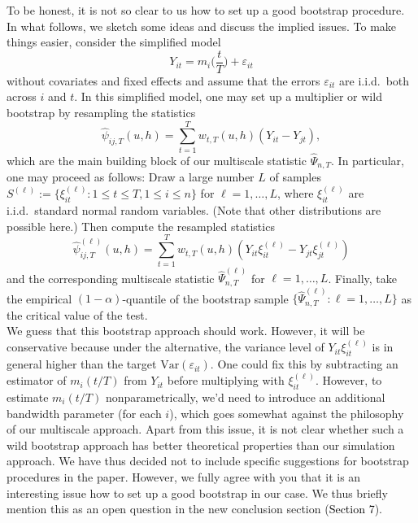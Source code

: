 \documentclass[a4paper,12pt]{article}
\newcommand{\reference}[1]{\textcolor{black}{#1}}
\begin{document}
\begin{enumerate}[label=\arabic*.,leftmargin=0.6cm]
To be honest, it is not so clear to us how to set up a good bootstrap procedure. In what follows, we sketch some ideas and discuss the implied issues. To make things easier, consider the simplified model 
\[ Y_{it} = m_i\Big(\frac{t}{T}\Big) + \varepsilon_{it} \]
without covariates and fixed effects and assume that the errors $\varepsilon_{it}$ are i.i.d.\ both across $i$ and $t$. In this simplified model, one may set up a multiplier or wild bootstrap by resampling the statistics
\[ \widehat{\psi}_{ij,T}(u,h) = \sum_{t=1}^T w_{t,T}(u,h) (Y_{it} - Y_{jt}), \]
which are the main building block of our multiscale statistic $\widehat{\Psi}_{n,T}$. In particular, one may proceed as follows: Draw a large number $L$ of samples $S^{(\ell)} := \{\xi_{it}^{(\ell)}: 1 \le t \le T, 1 \le i \le n \}$ for $\ell=1,\ldots,L$, where $\xi_{it}^{(\ell)}$ are i.i.d.\ standard normal random variables. (Note that other distributions are possible here.) Then compute the resampled statistics  
\[ \widehat{\psi}_{ij,T}^{(\ell)}(u,h) = \sum_{t=1}^T w_{t,T}(u,h) (Y_{it} \xi_{it}^{(\ell)} - Y_{jt} \xi_{jt}^{(\ell)}) \]
and the corresponding multiscale statistic $\widehat{\Psi}_{n,T}^{(\ell)}$ for $\ell=1,\ldots,L$. Finally, take the empirical $(1-\alpha)$-quantile of the bootstrap sample $\{ \widehat{\Psi}_{n,T}^{(\ell)}:  \ell=1,\ldots,L \}$ as the critical value of the test. \\
We guess that this bootstrap approach should work. However, it will be conservative because under the alternative, the variance level of $Y_{it} \xi_{it}^{(\ell)}$ is in general higher than the target $\text{Var}(\varepsilon_{it})$. One could fix this by subtracting an estimator of $m_i(t/T)$ from $Y_{it}$ before multiplying with $\xi_{it}^{(\ell)}$. However, to estimate $m_i(t/T)$ nonparametrically, we'd need to introduce an additional bandwidth parameter (for each $i$), which goes somewhat against the philosophy of our multiscale approach.
Apart from this issue, it is not clear whether such a wild bootstrap approach has better theoretical properties than our simulation approach. We have thus decided not to include specific suggestions for bootstrap procedures in the paper. However, we fully agree with you that it is an interesting issue how to set up a good bootstrap in our case. We thus briefly mention this as an open question in the new conclusion section (\reference{Section 7}). 



\end{enumerate}
\end{document}
